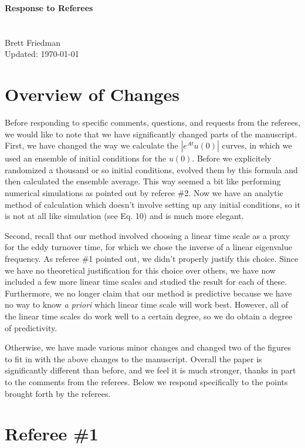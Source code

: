 \documentclass[12pt]{article}
\begin{document}
{\bf Response to Referees \\
 \\
 \\} 
Brett Friedman \\
Updated: \today \\

\hrulefill

\section{Overview of Changes}

Before responding to specific comments, questions, and requests from the referees, we would like to note that we have significantly changed parts of the manuscript. First, we have
changed the way we calculate the $|e^{A t}u(0)|$ curves, in which we used an ensemble of initial conditions for the $u(0)$. Before we explicitely randomized a thousand or so initial conditions, 
evolved them by this formula and then calculated the ensemble average. This way seemed a bit like performing numerical simulations as pointed out by referee \#2. 
Now we have an analytic method of calculation which doesn't involve setting up any initial
conditions, so it is not at all like simulation (see Eq. 10) and is much more elegant.

Second, recall that our method involved choosing a linear time scale as a proxy for the eddy turnover time, for which we chose the inverse of a linear eigenvalue frequency. 
As referee \#1 pointed out, we didn't properly justify this choice. Since we have no theoretical justification for this choice over others, 
we have now included a few more linear time scales and studied the result for each of these. Furthermore, we no longer claim that our method
is predictive because we have no way to know \emph{a priori} which linear time scale will work best. However, all of the linear time scales do work well to a certain degree, so
we do obtain a degree of predictivity.

Otherwise, we have made various minor changes and changed two of the figures to fit in with the above changes to the manuscript. 
Overall the paper is significantly different than before, and we feel it is much stronger, thanks in part to the comments from the referees.
Below we respond specifically to the points brought forth by the referees.


\section{Referee \#1}
\end{document}
